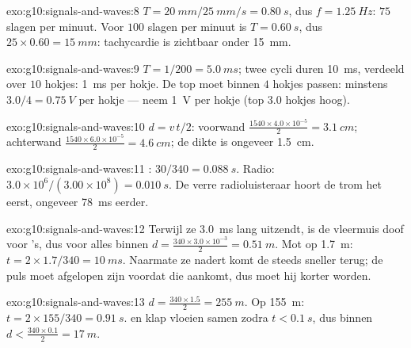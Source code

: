 \begin{solution}{exo:g10:signals-and-waves:8}
$T = \qty{20}{mm}/\qty{25}{mm/s} = \qty{0.80}{s}$, dus
$f = \qty{1.25}{Hz}$: $75$ slagen per minuut. Voor $100$ slagen per
minuut is $T = \qty{0.60}{s}$, dus $25 \times 0.60 = \qty{15}{mm}$:
tachycardie is zichtbaar onder \qty{15}{mm}.
\end{solution}

\begin{solution}{exo:g10:signals-and-waves:9}
$T = 1/200 = \qty{5.0}{ms}$; twee cycli duren \qty{10}{ms}, verdeeld
over $10$ hokjes:  \qty{1}{ms} per hokje. De top moet binnen
$4$ hokjes passen:  minstens $3.0/4 = \qty{0.75}{V}$ per
hokje --- neem \qty{1}{V} per hokje (top $3.0$ hokjes hoog).
\end{solution}

\begin{solution}{exo:g10:signals-and-waves:10}
$d = v\,t/2$: voorwand
$\frac{1540 \times 4.0\times10^{-5}}{2} = \qty{3.1}{cm}$; achterwand
$\frac{1540 \times 6.0\times10^{-5}}{2} = \qty{4.6}{cm}$; de dikte is
ongeveer \qty{1.5}{cm}.
\end{solution}

\begin{solution}{exo:g10:signals-and-waves:11}
: $30/340 = \qty{0.088}{s}$. Radio:
$3.0\times10^{6}/(3.00\times10^{8}) = \qty{0.010}{s}$. De verre
radioluisteraar hoort de trom het eerst, ongeveer \qty{78}{ms} eerder.
\end{solution}

\begin{solution}{exo:g10:signals-and-waves:12}
Terwijl ze \qty{3.0}{ms} lang uitzendt, is de vleermuis doof voor
's, dus voor alles binnen
$d = \frac{340 \times 3.0\times10^{-3}}{2} = \qty{0.51}{m}$. Mot op
\qty{1.7}{m}: $t = 2 \times 1.7/340 = \qty{10}{ms}$. Naarmate ze nadert
komt de  steeds sneller terug; de puls moet afgelopen zijn voordat
die aankomt, dus moet hij korter worden.
\end{solution}

\begin{solution}{exo:g10:signals-and-waves:13}
$d = \frac{340 \times 1.5}{2} = \qty{255}{m}$. Op \qty{155}{m}:
$t = 2 \times 155/340 = \qty{0.91}{s}$.  en klap vloeien samen zodra
$t < \qty{0.1}{s}$, dus binnen
$d < \frac{340 \times 0.1}{2} = \qty{17}{m}$.
\end{solution}

